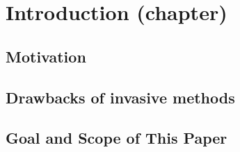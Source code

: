 
\chapter{Introduction (chapter)}
\label{cha:Introduction}

\section{Motivation}
\label{sec:Motivation}

\section{Drawbacks of invasive methods}
\label{sec:Drawbacks of invasive methods}

\section{Goal and Scope of This Paper}
\label{sec:Goal and Scope of This Paper}
